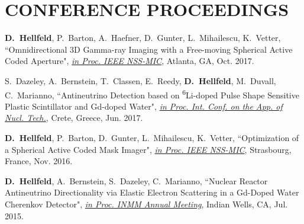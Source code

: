 \section{\small{CONFERENCE PROCEEDINGS}}

 \begin{thebibliography}{3}
 \raggedright
 \vspace{10pt}
 


 \textbf{D.~Hellfeld}, P.~Barton, A.~Haefner, D.~Gunter, L.~Mihailescu, K.~Vetter, ``Omnidirectional 3D Gamma-ray Imaging with a Free-moving Spherical Active Coded Aperture", \href{http://www.nss-mic.org/2017/Welcome.asp}{\emph{in Proc. IEEE NSS-MIC}}, Atlanta, GA, Oct. 2017.


  S.~Dazeley, A.~Bernstein, T.~Classen, E.~Reedy, \textbf{D.~Hellfeld}, M.~Duvall, C.~Marianno, ``Antineutrino Detection based on \textsuperscript{6}Li-doped Pulse Shape Sensitive Plastic Scintillator and Gd-doped Water", \href{http://www.creteconf.org/index.html}{\emph{in Proc. Int. Conf. on the App. of Nucl. Tech.}}, Crete, Greece, Jun. 2017. 
 
  \textbf{D.~Hellfeld}, P.~Barton, D.~Gunter, L.~Mihailescu, K.~Vetter, ``Optimization of a Spherical Active Coded Mask Imager", \href{http://ieeexplore.ieee.org/document/8069853/}{\emph{in Proc. IEEE NSS-MIC}}, Strasbourg, France, Nov. 2016. 
 
  \textbf{D.~Hellfeld}, A.~Bernstein, S.~Dazeley, C.~Marianno, ``Nuclear Reactor Antineutrino Directionality via Elastic Electron Scattering in a Gd-Doped Water Cherenkov Detector", \href{https://www.inmm.org/INMM-Resources/Proceedings-Presentations/Annual-Meeting-Proceedings}{\emph{in Proc. INMM Annual Meeting}}, Indian Wells, CA, Jul. 2015. 
 
 \end{thebibliography}
